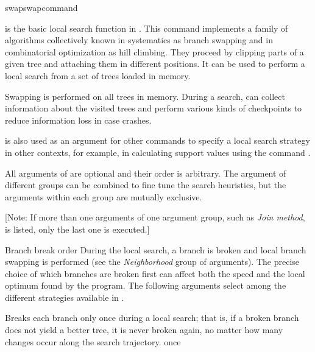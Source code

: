 \begin{command}{swap}{swapcommand}


	\begin{poydescription} 
         is the basic local search function in \poy. This
        command implements a family of algorithms collectively known in systematics as
        branch swapping and in combinatorial optimization as hill climbing. 
        They proceed by clipping parts of a given tree and
        attaching them in different positions.  It can be
        used to perform a local search from a set of trees loaded in memory.

        Swapping is performed on all trees in memory. During a search,
         can collect information about the
        visited trees and perform various kinds of checkpoints to reduce
        information loss in case \poy crashes.

         is also used as an argument for other
        commands to specify a local search strategy in other contexts, for example,
        in calculating support values using the command
        .
        
        All arguments of  are optional and their order
        is arbitrary. The argument of different groups can be combined to fine tune the search 
        heuristics, but the arguments within each group are mutually exclusive. 
        
        [Note: If more than one arguments of one argument group, such as \emph {Join method}, 
        is listed, only the last one is executed.]
    \end{poydescription}

\begin{arguments}

  \begin{argumentgroup}{Branch break order}
            {During the local search, a branch is broken and local branch swapping
            is performed (see the \emph{Neighborhood} group of arguments).  The
            precise choice of which branches are broken first can affect both 
            the speed and the local optimum found by the program. The following 
            arguments select among the different strategies available in \poy.}
        
                {Breaks each branch only once during a local search; that is, if a
                broken branch does not yield a better tree, it is never broken again,
                no matter how many changes occur along the search trajectory.}
                {once}


\end{argumentgroup}
\end{arguments}
\end{command}
